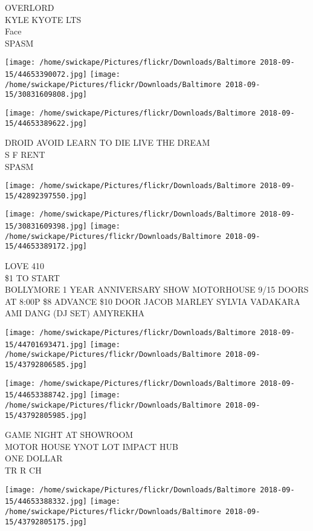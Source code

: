 \documentclass[10pt,letterpaper]{article}
\begin{document}
OVERLORD\\
KYLE KYOTE LTS\\
Face\\
SPASM
\pagebreak

\texttt{[image: /home/swickape/Pictures/flickr/Downloads/Baltimore 2018-09-15/44653390072.jpg]}
\texttt{[image: /home/swickape/Pictures/flickr/Downloads/Baltimore 2018-09-15/30831609808.jpg]}

\texttt{[image: /home/swickape/Pictures/flickr/Downloads/Baltimore 2018-09-15/44653389622.jpg]}

DROID AVOID LEARN TO DIE LIVE THE DREAM\\
S F RENT\\
SPASM
\pagebreak

\texttt{[image: /home/swickape/Pictures/flickr/Downloads/Baltimore 2018-09-15/42892397550.jpg]}

\vspace{0.25in}
\texttt{[image: /home/swickape/Pictures/flickr/Downloads/Baltimore 2018-09-15/30831609398.jpg]}
\texttt{[image: /home/swickape/Pictures/flickr/Downloads/Baltimore 2018-09-15/44653389172.jpg]}

LOVE 410\\
\$1 TO START\\
BOLLYMORE 1 YEAR ANNIVERSARY SHOW MOTORHOUSE 9/15 DOORS AT 8:00P \$8 ADVANCE \$10 DOOR JACOB MARLEY SYLVIA VADAKARA AMI DANG (DJ SET) AMYREKHA
\pagebreak

\texttt{[image: /home/swickape/Pictures/flickr/Downloads/Baltimore 2018-09-15/44701693471.jpg]}
\texttt{[image: /home/swickape/Pictures/flickr/Downloads/Baltimore 2018-09-15/43792806585.jpg]}

\texttt{[image: /home/swickape/Pictures/flickr/Downloads/Baltimore 2018-09-15/44653388742.jpg]}
\texttt{[image: /home/swickape/Pictures/flickr/Downloads/Baltimore 2018-09-15/43792805985.jpg]}

GAME NIGHT AT SHOWROOM\\
MOTOR HOUSE YNOT LOT IMPACT HUB\\
ONE DOLLAR\\
TR R CH
\pagebreak

\texttt{[image: /home/swickape/Pictures/flickr/Downloads/Baltimore 2018-09-15/44653388332.jpg]}
\texttt{[image: /home/swickape/Pictures/flickr/Downloads/Baltimore 2018-09-15/43792805175.jpg]}
\end{document}
